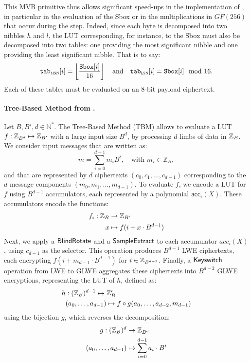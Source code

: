 This MVB primitive thus allows significant speed-ups in the implementation of \cite{DBLP:conf/wahc/TramaCBS23}, in particular in the evaluation of the Sbox or in the multiplications in $GF(256)$ that occur during the \MixColumns step. Indeed, since each byte is decomposed into two nibbles $h$ and $l$, the LUT corresponding, for instance, to the Sbox must also be decomposed into two tables: one providing the most significant nibble and one providing the least significant nibble. That is to say: 
$$
\texttt{tab}_{\textsc{msn}}[i] = \left\lfloor \frac{\texttt{Sbox}[i]}{16} \right\rfloor \quad \text{and} \quad \texttt{tab}_{\textsc{lsn}}[i] = \texttt{Sbox}[i] \mod 16.
$$
Each of these tables must be evaluated on an 8-bit payload ciphertext. 


\paragraph{Tree-Based Method from \cite{DBLP:conf/wahc/TramaCBS23}.}
\label{prim:tbb}

Let $B, B', d \in \mathbb N^*$. The Tree-Based Method (TBM) allows to evaluate a LUT $f: \mathbb{Z}_{B^d} \mapsto \mathbb{Z}_ {B'}$ with a large input size $B^d$, by processing $d$ limbs of data in $\mathbb{Z}_B$. We consider input messages that are written as:
$$
    m = \sum_{i=0}^{d-1} m_i B^i, \quad \text{with } m_i \in \mathbb{Z}_B,
$$
and that are represented by $d$ ciphertexts $(c_0, c_1, \dots, c_{d-1})$ corresponding to the $d$ message components $(m_0, m_1, \dots, m_{d-1})$. 
%
To evaluate $f$, we encode a LUT for $f$ using $B^{d-1}$ accumulators, each represented by a polynomial $\textsf{acc}_i(X)$. These accumulators encode the functions:
%
    \begin{align*}
        f_i: \mathbb{Z}_B &\rightarrow \mathbb{Z}_{B'}\\
             x &\mapsto f(i + x \cdot B^{d-1})
    \end{align*}
%
Next, we apply a $\sf{BlindRotate}$ and a $\sf{SampleExtract}$ to each accumulator $acc_i(X)$, using $c_{d-1}$ as the selector. This operation produces $B^{d-1}$ LWE ciphertexts, each encrypting $f (i + m_{d-1} \cdot B^{d-1})$ for $i \in \mathbb{Z}_{B^{d-1}}$.
%    
Finally, a $\sf{Keyswitch}$ operation from LWE to GLWE aggregates these ciphertexts into $B^{d-2}$ GLWE encryptions, representing the LUT of $h$, defined as:
    \begin{align*}
        h &: (\mathbb{Z}_{B})^{d-1} \mapsto \mathbb{Z}_B' \\
          & (a_0, \dots, a_{d-1}) \mapsto f \circ g(a_0, \dots, a_{d-2}, m_{d-1})
    \end{align*}
using the bijection $g$, which reverses the decomposition:
    \begin{align*}
        g: (\mathbb{Z}_B)^d &\rightarrow \mathbb{Z}_{B^d} \\
           (a_0, \dots, a_{d-1}) &\mapsto \sum_{i=0}^{d-1} a_i \cdot B^i
    \end{align*} 

